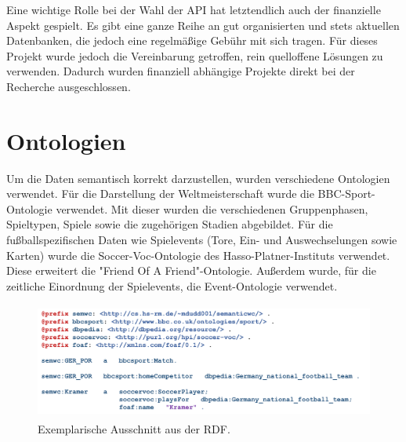 \documentclass[runningheads,a4paper]{llncs}
\begin{document}
Eine wichtige Rolle bei der Wahl der API hat letztendlich auch der finanzielle Aspekt gespielt. Es gibt eine ganze Reihe an gut organisierten und stets aktuellen Datenbanken, die jedoch eine regelmäßige Gebühr mit sich tragen. Für dieses Projekt wurde jedoch die Vereinbarung getroffen, rein quelloffene Lösungen zu verwenden. Dadurch wurden finanziell abhängige Projekte direkt bei der Recherche ausgeschlossen. 
  
\section{Ontologien}
Um die Daten semantisch korrekt darzustellen, wurden verschiedene Ontologien verwendet. Für die Darstellung der Weltmeisterschaft wurde die BBC-Sport-Ontologie verwendet. Mit dieser wurden die verschiedenen Gruppenphasen, Spieltypen, Spiele sowie die zugehörigen Stadien abgebildet. Für die fußballspezifischen Daten wie Spielevents (Tore, Ein- und Auswechselungen sowie Karten) wurde die Soccer-Voc-Ontologie des Hasso-Platner-Instituts verwendet. Diese erweitert die "Friend Of A Friend"{}-Ontologie. Außerdem wurde, für die zeitliche Einordnung der Spielevents, die Event-Ontologie verwendet.\\
 

\begin{figure}
\centering
\includegraphics[height=3.8cm]{turtle}
\caption{Exemplarische Ausschnitt aus der RDF.}
\label{fig:turtlerdf}
\end{figure}


\end{document}
